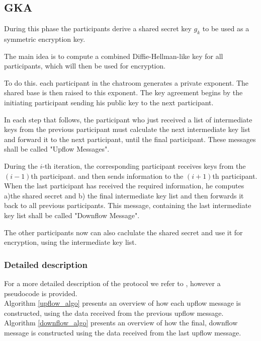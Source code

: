 \clearpage
\subsection{GKA}
\label{subsections:gka}

During this phase the participants derive a shared secret key $g_k$ to be used
as a symmetric encryption key.

The main idea is to compute a combined Diffie-Hellman-like key for all
participants, which will then be used for encryption.

To do this. each participant in the chatroom generates a private exponent.
The shared base is then raised to this exponent. The key agreement begins
by the initiating participant sending his public key to the next participant.

In each step that follows, the participant who just received a list of intermediate
keys from the previous participant must calculate the next intermediate key list and
forward it to the next participant, until the final participant. These messages
shall be called "Upflow Messages".

During the $i$-th iteration, the corresponding participant receives keys from the
$(i - 1)$th participant. and then sends information to the $(i + 1)$th participant.
When the last participant has received the required information, he computes a)the
shared secret and b) the final intermediate key list and then forwards it back to
all previous participants. This message, containing the last intermediate key list
shall be called "Downflow Message".

The other participants now can also caclulate the shared secret and use it for
encryption, using the intermediate key list.

\subsubsection{Detailed description}
For a more detailed description of the protocol we refer to \cite{mpenc}, however
a pseudocode is provided.\\

Algorithm \ref{upflow_algo} presents an overview of how each upflow message is constructed, using the data received from the previous upflow message.\\

Algorithm \ref{downflow_algo} presents an overview of how the final, downflow message is constructed using the data received from the last upflow message.\\


